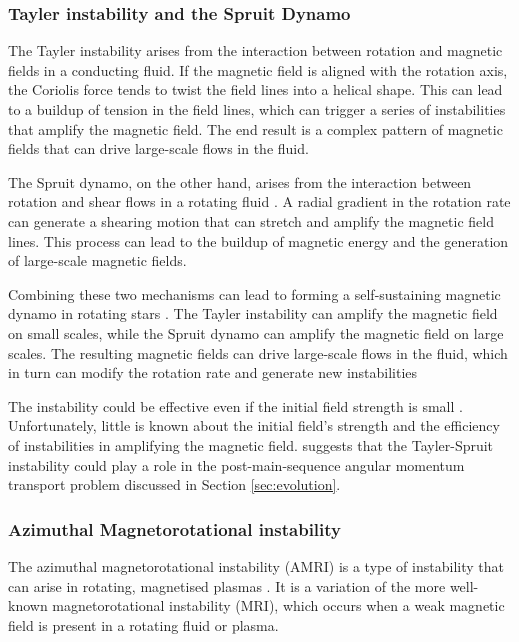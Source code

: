 \subsubsection{Tayler instability and the Spruit Dynamo}

The Tayler instability arises from the interaction between rotation and magnetic fields in a conducting fluid. 
If the magnetic field is aligned with the rotation axis, the Coriolis force tends to twist the field lines into a helical shape.
This can lead to a buildup of tension in the field lines, which can trigger a series of instabilities that amplify the magnetic field.
The end result is a complex pattern of magnetic fields that can drive large-scale flows in the fluid.

The Spruit dynamo, on the other hand, arises from the interaction between rotation and shear flows in a rotating fluid \citep{spruit_dynamo_2002}.
A radial gradient in the rotation rate can generate a shearing motion that can stretch and amplify the magnetic field lines.
This process can lead to the buildup of magnetic energy and the generation of large-scale magnetic fields.

Combining these two mechanisms can lead to forming a self-sustaining magnetic dynamo in rotating stars \citep{spruit_differential_1999}. The Tayler instability can amplify the magnetic field on small scales, while the Spruit dynamo can amplify the magnetic field on large scales. The resulting magnetic fields can drive large-scale flows in the fluid, which in turn can modify the rotation rate and generate new instabilities \citep{fuller_asteroseismology_2015,fuller_slowing_2019}

The instability could be effective even if the initial field strength is small \citep{spruit_why_1998}.
Unfortunately, little is known about the initial field's strength and the efficiency of instabilities in amplifying the magnetic field.
\citet{fuller_slowing_2019} suggests that the Tayler-Spruit instability could play a role in the post-main-sequence angular momentum transport problem discussed in Section \ref{sec:evolution}.

\subsubsection{Azimuthal Magnetorotational instability}

The azimuthal magnetorotational instability (AMRI) is a type of instability that can arise in rotating, magnetised plasmas \citep{hollerbach_non-axisymmetric_2010}. 
It is a variation of the more well-known magnetorotational instability (MRI), which occurs when a weak magnetic field is present in a rotating fluid or plasma.

